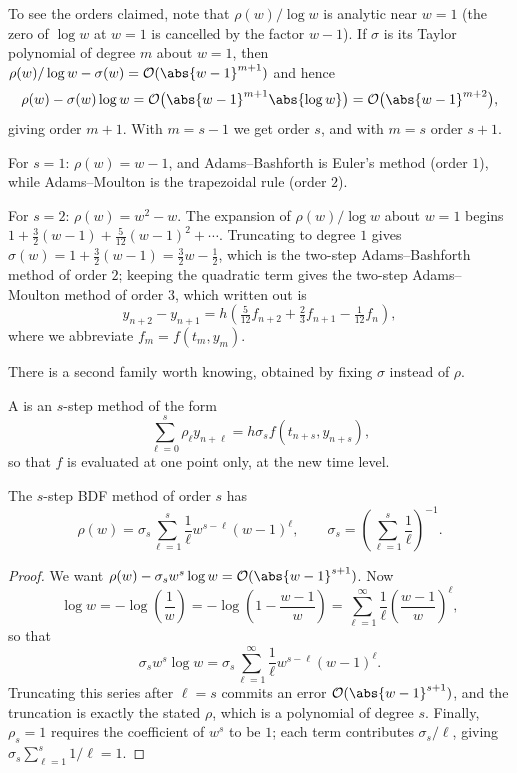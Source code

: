 To see the orders claimed, note that $\rho(w)/\log w$ is analytic near $w=1$ (the zero of $\log w$ at $w=1$ is cancelled by the factor $w-1$). If $\sigma$ is its Taylor polynomial of degree $m$ about $w=1$, then $\rho(w)/\log w - \sigma(w) = \mathcal{O}(\abs{w-1}^{m+1})$ and hence
$$
\rho(w) - \sigma(w)\log w = \mathcal{O}\big(\abs{w-1}^{m+1}\abs{\log w}\big) = \mathcal{O}\big(\abs{w-1}^{m+2}\big),
$$
giving order $m+1$. With $m = s-1$ we get order $s$, and with $m=s$ order $s+1$.

\begin{example}
  For $s = 1$: $\rho(w) = w-1$, and Adams--Bashforth is Euler's method (order $1$), while Adams--Moulton is the trapezoidal rule (order $2$).

  For $s = 2$: $\rho(w) = w^2 - w$. The expansion of $\rho(w)/\log w$ about $w = 1$ begins $1 + \tfrac32 (w-1) + \tfrac{5}{12}(w-1)^2 + \cdots$. Truncating to degree $1$ gives $\sigma(w) = 1 + \tfrac32(w-1) = \tfrac32 w - \tfrac12$, which is the two-step Adams--Bashforth method of order $2$; keeping the quadratic term gives the two-step Adams--Moulton method of order $3$, which written out is
  $$
  y_{n+2} - y_{n+1} = h\left(\tfrac{5}{12}f_{n+2} + \tfrac{2}{3}f_{n+1} - \tfrac1{12}f_n\right),
  $$
  where we abbreviate $f_m = f(t_m,y_m)$.
\end{example}

There is a second family worth knowing, obtained by fixing $\sigma$ instead of $\rho$.

\begin{definition}
  A  is an $s$-step method of the form
  $$
  \sum_{\ell=0}^{s}\rho_\ell y_{n+\ell} = h\sigma_s f(t_{n+s}, y_{n+s}),
  $$
  so that $f$ is evaluated at one point only, at the new time level.
\end{definition}

\begin{theorem}
  The $s$-step BDF method of order $s$ has
  $$
  \rho(w) = \sigma_s\sum_{\ell=1}^{s}\frac{1}{\ell}w^{s-\ell}(w-1)^{\ell}, \qquad \sigma_s = \left(\sum_{\ell=1}^s \frac{1}{\ell}\right)^{-1}.
  $$
\end{theorem}
\begin{proof}
  We want $\rho(w) - \sigma_s w^s \log w = \mathcal{O}(\abs{w-1}^{s+1})$. Now
  $$
  \log w = -\log\left(\frac{1}{w}\right) = -\log\left(1 - \frac{w-1}{w}\right) = \sum_{\ell = 1}^{\infty}\frac{1}{\ell}\left(\frac{w-1}{w}\right)^{\ell},
  $$
  so that
  $$
  \sigma_s w^s \log w = \sigma_s\sum_{\ell=1}^{\infty}\frac{1}{\ell}w^{s-\ell}(w-1)^\ell .
  $$
  Truncating this series after $\ell = s$ commits an error $\mathcal{O}(\abs{w-1}^{s+1})$, and the truncation is exactly the stated $\rho$, which is a polynomial of degree $s$. Finally, $\rho_s = 1$ requires the coefficient of $w^s$ to be $1$; each term contributes $\sigma_s/\ell$, giving $\sigma_s\sum_{\ell=1}^s 1/\ell = 1$.
\end{proof}

